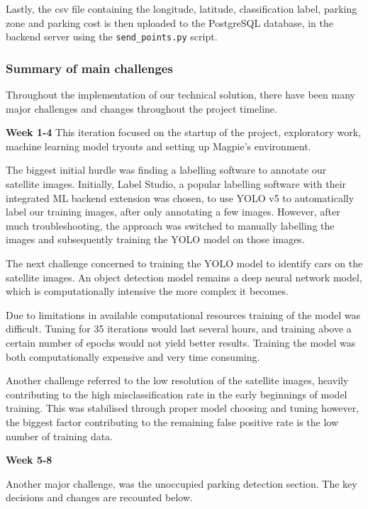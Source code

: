 Lastly, the csv file containing the longitude, latitude, classification label, parking
zone and parking cost is then uploaded to the PostgreSQL database, in the
backend server using the \texttt{send\_points.py} script.

\newpage{}

\subsubsection{Summary of main challenges}
Throughout the implementation of our technical solution, there have been many
major challenges and changes throughout the project timeline.

\textbf{Week 1-4}
This iteration focused on the startup of the project, exploratory work, machine
learning model tryouts and setting up Magpie's environment.

The biggest initial hurdle was finding a labelling software to annotate our satellite images.
Initially, Label Studio, a popular labelling software with their integrated ML backend extension was chosen, 
to use YOLO v5 to automatically label our training images, after only annotating a few images.
However, after much troubleshooting, the approach was switched to
manually labelling the images and subsequently training the YOLO model on those images.

The next challenge concerned to training the YOLO model to identify cars on the
satellite images. An object detection model remains a deep neural network model,
which is computationally intensive the more complex it becomes.

Due to limitations in available computational resources training of the model was difficult. 
Tuning for 35 iterations would last several hours, and
training above a certain number of epochs would not yield better results.
Training the model was both computationally expensive and very time consuming.

Another challenge referred to the low resolution of the satellite images,
heavily contributing to the high misclassification rate in the early beginnings of
model training. This was stabilised through proper model choosing and
tuning however, the biggest factor contributing to the remaining false positive
rate is the low number of training data.

\textbf{Week 5-8}

Another major challenge, was the unoccupied parking detection section. The key
decisions and changes are recounted below.

